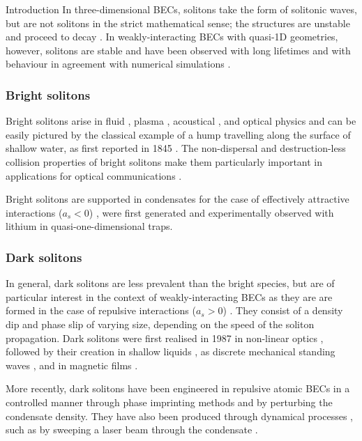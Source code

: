 \begin{chapter}{\label{cha:bose_gases}Introduction}
In three-dimensional BECs, solitons take the form of solitonic waves, but are not solitons in the strict mathematical sense; the structures are unstable and proceed to decay \cite{Burger99,PhysRevA.62.053606,PhysRevA.65.043612,Tikhonenko96}. In weakly-interacting BECs with quasi-1D geometries, however, solitons are stable and have been observed with long lifetimes and with behaviour in agreement with numerical simulations \cite{PhysRevLett.101.120406}.

\subsubsection{Bright solitons}
Bright solitons arise in fluid \cite{Russell45}, plasma \cite{PhysRevLett.37.693,PhysRevLett.33.886}, acoustical \cite{naugolnykh1998nonlinear}, and optical physics \cite{agrawal2001nonlinear} and can be easily pictured by the classical example of a hump travelling along the surface of shallow water, as first reported in 1845 \cite{Russell45}. The non-dispersal and destruction-less collision properties of bright solitons make them particularly important in applications for optical communications \cite{hasegawa1995solitons}.

Bright solitons are supported in condensates for the case of effectively attractive interactions ($a_s < 0$) \cite{PhysRevA.62.063611}, were first generated and experimentally observed with lithium \cite{Strecker02,Khaykovich1290} in quasi-one-dimensional traps.

\subsubsection{Dark solitons}
In general, dark solitons are less prevalent than the bright species, but are of particular interest in the context of weakly-interacting BECs as they are are formed in the case of repulsive interactions ($a_s > 0$) \cite{PhysRevA.62.063610}. They consist of a density dip and phase slip \cite{dodd1982solitons} of varying size, depending on the speed of the soliton propagation. Dark solitons were first realised in 1987 in non-linear optics \cite{Emplit87}, followed by their creation in shallow liquids \cite{PhysRevLett.64.1518}, as discrete mechanical standing waves \cite{PhysRevLett.68.1730}, and in magnetic films \cite{PhysRevLett.70.1707}.

More recently, dark solitons have been engineered in repulsive atomic BECs in a controlled manner through phase imprinting methods \cite{Denschlag97,Burger99,PhysRevLett.86.2926,PhysRevLett.101.120406} and by perturbing the condensate density. They have also been produced through dynamical processes \cite{Weller08,PhysRevLett.99.160405}, such as by sweeping a laser beam through the condensate \cite{PhysRevLett.99.160405}. 


\end{chapter}
